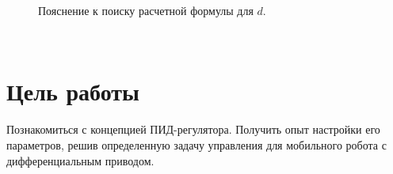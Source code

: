 \documentclass[12pt,a4paper,openany]{extarticle}
\begin{document}
\begin{figure}[h!]
	\caption{Пояснение к поиску расчетной формулы для $d$.}
	\label{fig:distance_finding}
\end{figure}
\newpage
{$\phantom{-}$}
\newpage				 
\section{Цель работы}
\hspace*{\parindent}Познакомиться с концепцией ПИД-регулятора.
Получить опыт настройки его параметров, решив определенную задачу управления для мобильного робота с дифференциальным приводом.
\end{document}
